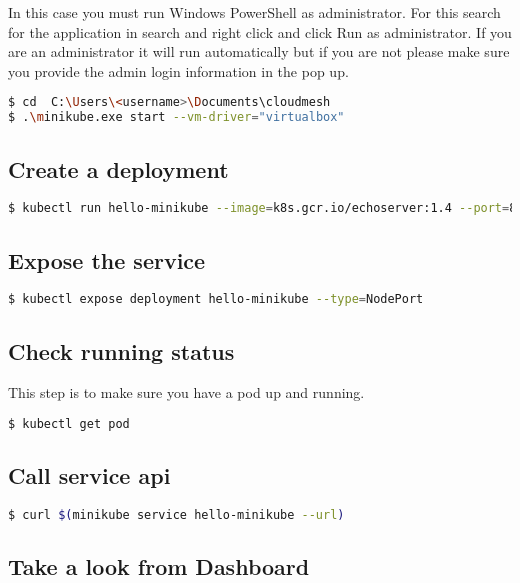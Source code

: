 In this case you must run Windows PowerShell as administrator. For
this search for the application in search and right click and click Run
as administrator. If you are an administrator it will run automatically
but if you are not please make sure you provide the admin login
information in the pop up.

\begin{lstlisting}[language=bash]
$ cd  C:\Users\<username>\Documents\cloudmesh
$ .\minikube.exe start --vm-driver="virtualbox"
\end{lstlisting}

\subsection{Create a deployment}

\begin{lstlisting}[language=bash]
$ kubectl run hello-minikube --image=k8s.gcr.io/echoserver:1.4 --port=8080
\end{lstlisting}

\subsection{Expose the service}

\begin{lstlisting}[language=bash]
$ kubectl expose deployment hello-minikube --type=NodePort
\end{lstlisting}

\subsection{Check running status}

This step is to make sure you have a pod up and running.

\begin{lstlisting}[language=bash]
$ kubectl get pod
\end{lstlisting}

\subsection{Call service api}

\begin{lstlisting}[language=bash]
$ curl $(minikube service hello-minikube --url)
\end{lstlisting}

\subsection{Take a look from Dashboard}


